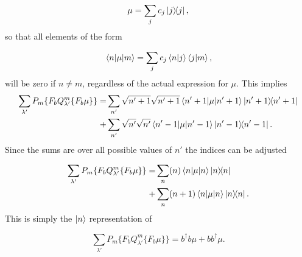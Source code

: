 \documentclass[12pt]{article}
\begin{document}
\begin{equation}
    \mu = \sum_{j} c_j \ketbra{j}{j},
\end{equation} so that all elements of the form

\begin{equation}
    \mel{n}{\mu}{m} = \sum_{j} c_j \braket{n}{j}\braket{j}{m},
\end{equation} will be zero if $n\neq m$, regardless of the actual expression for $\mu$. This implies
\begin{align*}
    \sum_{\lambda'}  P_m\{F_b Q^m_{\lambda'}\{F_b\mu\}\}=&\sum_{n'} \sqrt{n'+1}\sqrt{n'+1}\mel{n'+1}{\mu}{n'+1}\ketbra{n'+1}{n'+1}\\
    +&\sum_{n'} \sqrt{n'}\sqrt{n'}\mel{n'-1}{\mu}{n'-1}\ketbra{n'-1}{n'-1}.
\end{align*} Since the sums are over all possible values of $n'$ the indices can be adjusted 

\begin{align*}
    \sum_{\lambda'}  P_m\{F_b Q^m_{\lambda'}\{F_b\mu\}\}=&\sum_{n} (n)\mel{n}{\mu}{n}\ketbra{n}{n}\\
    +&\sum_{n} (n+1)\mel{n}{\mu}{n}\ketbra{n}{n}.
\end{align*} This is simply the $\ket{n}$ representation of

\begin{equation}
    \sum_{\lambda'}  P_m\{F_b Q^m_{\lambda'}\{F_b\mu\}\}= b^\dagger b \mu+ bb^\dagger \mu.
\end{equation}



\end{document}
